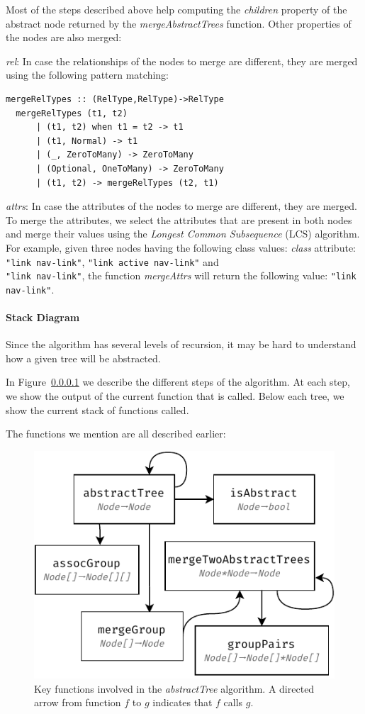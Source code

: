 Most of the steps described above help computing the \emph{children} property of the abstract node returned by the \emph{mergeAbstractTrees} function.
Other properties of the nodes are also merged: 
\begin{compactdesc}
\item[\emph{rel}:] In case the relationships of the nodes to merge are different, they are merged using the following pattern matching:
\begin{lstlisting}[basicstyle=\small]
  mergeRelTypes :: (RelType,RelType)->RelType
  mergeRelTypes (t1, t2)
      | (t1, t2) when t1 = t2 -> t1
      | (t1, Normal) -> t1
      | (_, ZeroToMany) -> ZeroToMany
      | (Optional, OneToMany) -> ZeroToMany
      | (t1, t2) -> mergeRelTypes (t2, t1)
\end{lstlisting}

\item[\emph{attrs}:] In case the attributes of the nodes to merge are different, they are merged.
To merge the attributes, we select the attributes that are present in both nodes and merge their values using the \emph{Longest Common Subsequence} (LCS) algorithm.
For example, given three nodes having the following class values:  \emph{class} attribute: \lstinline{"link nav-link"}, \lstinline{"link active nav-link"} and \\\lstinline{"link nav-link"}, the function \emph{mergeAttrs}  will return the following value: \lstinline{"link nav-link"}.
\end{compactdesc}

\paragraph{Stack Diagram}
Since the algorithm has several levels of recursion, it may be hard to understand how a given tree will be abstracted. 

In Figure~\ref{} we describe the different steps of the algorithm.
At each step, we show the output of the current function that is called.
Below each tree, we show the current stack of functions called.

The functions we mention are all described earlier:
\begin{figure}[]
  \centering
  \includegraphics[width=0.7\linewidth]{appstract/explanations/functions_relations}
  \caption{Key functions involved in the \emph{abstractTree} algorithm. A directed arrow from function $f$ to $g$ indicates that $f$ calls $g$.}
  \label{fig:functions_relations}
\end{figure}


